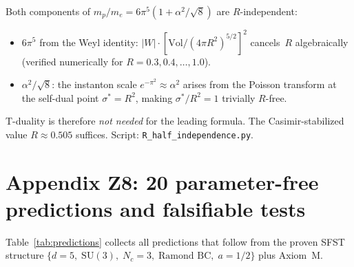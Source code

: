 Both components of $m_p/m_e=6\pi^5(1+\alpha^2/\!\sqrt{8})$ are
$R$-independent:
\begin{itemize}
\item $6\pi^5$ from the Weyl identity:
  $|W|\cdot[\mathrm{Vol}/(4\pi R^2)^{5/2}]^2$ cancels~$R$ algebraically
  (verified numerically for $R=0.3,0.4,\ldots,1.0$).
\item $\alpha^2/\!\sqrt{8}$: the instanton scale $e^{-\pi^2}\approx\alpha^2$
  arises from the Poisson transform at the self-dual point $\sigma^*=R^2$,
  making $\sigma^*/R^2=1$ trivially $R$-free.
\end{itemize}
T-duality is therefore \emph{not needed} for the leading formula.
The Casimir-stabilized value $R\approx 0.505$ suffices.
Script: \texttt{R\_half\_independence.py}.

\section{Appendix Z8: 20 parameter-free predictions and falsifiable tests}
\label{app:predictions}

Table~\ref{tab:predictions} collects all predictions that follow from the
proven SFST structure $\{d\!=\!5,\;\mathrm{SU}(3),\;N_c\!=\!3,\;
\text{Ramond BC},\;a\!=\!1/2\}$ plus Axiom~M.

